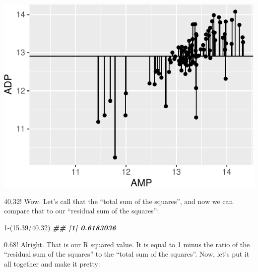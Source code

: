 \documentclass[
]{krantz}
\newenvironment{Shaded}{\begin{snugshade}}{\end{snugshade}}
\newcommand{\DecValTok}[1]{\textcolor[rgb]{0.00,0.00,0.81}{#1}}
\newcommand{\DocumentationTok}[1]{\textcolor[rgb]{0.56,0.35,0.01}{\textbf{\textit{#1}}}}
\newcommand{\FloatTok}[1]{\textcolor[rgb]{0.00,0.00,0.81}{#1}}
\newcommand{\NormalTok}[1]{#1}
\newcommand{\SpecialCharTok}[1]{\textcolor[rgb]{0.00,0.00,0.00}{#1}}
\begin{document}
\begin{center}\includegraphics[width=1\linewidth]{index_files/figure-latex/unnamed-chunk-130-1} \end{center}

40.32! Wow. Let's call that the ``total sum of the squares'', and now we can compare that to our ``residual sum of the squares'':

\begin{Shaded}
\begin{Highlighting}[]
\DecValTok{1}\SpecialCharTok{{-}}\NormalTok{(}\FloatTok{15.39}\SpecialCharTok{/}\FloatTok{40.32}\NormalTok{)}
\DocumentationTok{\#\# [1] 0.6183036}
\end{Highlighting}
\end{Shaded}

0.68! Alright. That is our R squared value. It is equal to 1 minus the ratio of the ``residual sum of the squares'' to the ``total sum of the squares''. Now, let's put it all together and make it pretty:
\end{document}
